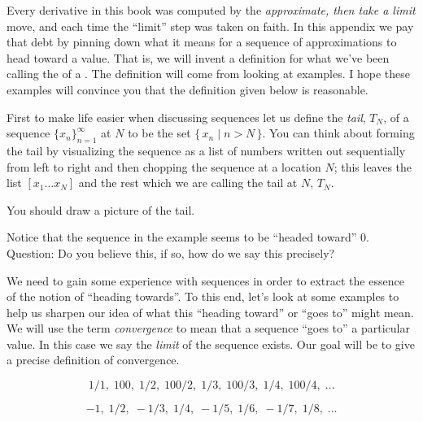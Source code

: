 %
%

Every derivative in this book was computed by the {\it approximate,
then take a limit\/} move, and each time the ``limit'' step was taken
on faith. In this appendix we pay that debt by pinning down what it
means for a sequence of approximations to head toward a value.
That is, we will invent a definition for what we've been calling
the  of a . The definition will come from looking at examples.
I hope these examples will convince you that the definition given 
below is reasonable. 

First to make life easier when discussing sequences let us define the 
{\it tail\/}, $T_N$, of a sequence $\{x_n\}_{n=1}^{\infty}$ at $N$ 
to be the set $\{\, x_n \mid n > N\, \}$.
You can think about forming the tail by visualizing the sequence as a list of
numbers written out sequentially from left to right and then
chopping the sequence at a location $N$; this leaves the 
list $[x_1 \ldots x_N]$ and the rest which we are calling the tail at $N$, 
$T_N$. 


You should draw a picture of the tail.

Notice that the sequence in the example seems to be ``headed toward'' $0$. 
Question: Do you believe this, if so, how do we say this precisely?

We need to gain some experience with sequences in order to 
extract the essence of the notion of ``heading towards''.
To this end, 
let's look at some examples to help us sharpen our idea of what 
this ``heading toward'' or ``goes to''
might mean. We will use the term {\it convergence\/} to 
mean that a sequence 
``goes to'' a particular value. In this case we say the {\it limit\/} 
of the sequence exists.
Our goal will be to give a precise definition
of convergence. 

$$
1/1, \; 100, \;1/2, \; 100/2, \; 1/3, \; 100/3, \; 1/4, \; 100/4, 
\; \ldots
$$

$$
-1, \; 1/2, \; -1/3, \; 1/4, \; -1/5, \; 1/6, \; -1/7, \; 1/8,
\; \ldots
$$

